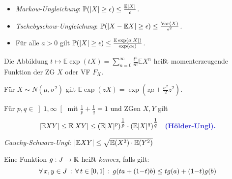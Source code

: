 \documentclass{cheat-sheet}
\renewcommand{\P}{\mathbb{P}} %
\newcommand{\E}{\mathbb{E}} %
\newcommand{\Var}{\mathrm{Var}} %
\begin{document}
\begin{kor}
  \begin{itemize}
    \item \emph{Markow-Ungleichung}: $\P(\abs{X} \geq \epsilon) \leq \tfrac{\E \abs{X}}{\epsilon}$.
    \item \emph{Tschebyschow-Ungleichung}: $\P(\abs{X - \E X} \geq \epsilon) \leq \tfrac{\Var(X)}{\epsilon^2}$.
    \item Für alle $a > 0$ gilt $\P(\abs{X} \geq \epsilon) \leq \tfrac{\E \exp(a \abs{X})}{\exp(a\epsilon) }$.
  \end{itemize}
\end{kor}

\iffalse
  $0 > B = \E \exp(a \abs{X}) \geq \frac{a^n \E \abs{X}^n}{n!}$
  $\implies$ $\E \abs{X}^n \leq \tfrac{B}{a^n} n!$ für alle $n \in \N$
  $\implies$ $\abs{\E X^n} \leq \tfrac{B}{a^n} n!$
  $\implies$ $\E \exp(z X)$ ist analytisch für $\abs{z} < a$
\fi

\begin{defn}
  Die Abbildung $t \mapsto \E \exp(t X) = \sum_{n=0}^\infty \tfrac{t^n}{n!} \E X^n$ heißt momenterzeugende Funktion der ZG $X$ oder VF $F_X$.
\end{defn}

\begin{bsp}
  Für $X \sim N(\mu, \sigma^2)$ gilt $\E \exp(z X) = \exp\left( z\mu + \tfrac{\sigma^2}{2} z^2 \right)$.
\end{bsp}

\begin{satz}
  Für $p, q \in \left] 1, \infty \right[$ mit $\tfrac{1}{p} + \tfrac{1}{q} = 1$ und ZGen $X, Y$ gilt
  \[
    \abs{\E X Y} \leq \E \abs{XY} \leq (\E \abs{X}^p)^{\tfrac{1}{p}} \cdot (\E \abs{X}^q)^{\tfrac{1}{q}}
    \quad \text{\emph{(Hölder-Ungl).}}
  \]
\end{satz}

\begin{kor}
  \emph{Cauchy-Schwarz-Ungl}: $\abs{\E XY} \leq \sqrt{ \E (X^2) \cdot \E(Y^2) }$
\end{kor}

\iffalse
  Verallgemeinerung:

  $\E(X_1^{n_1} \cdots X_k^{n_k}) \leq (\E \abs{X_1}^n)^{\tfrac{n_1}{n}} \cdots (\E \abs{X_k}^n)^{\tfrac{n_k}{n}}$, $n = n_1 + ... + n_k$
\fi

\begin{defn}
  Eine Funktion $g : J \to \mathbb{R}$ heißt \emph{konvex}, falls gilt:
  \[ \forall \, {x, y \in J} \,:\, \forall \, {t \in \left[ 0, 1 \right]} \,:\, g(t a + (1{-}t)b) \leq t g(a) + (1{-}t) g(b) \]
\end{defn}
\end{document}
